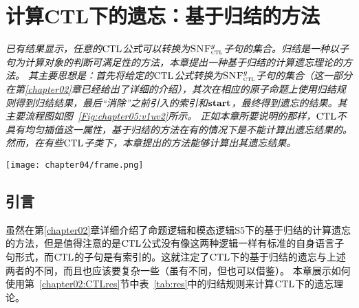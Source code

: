 \chapter{计算CTL下的遗忘：基于归结的方法}\label{chapter04}
{\em 
已有结果显示，任意的$\textrm{CTL}$公式可以转换为${\textsc{SNF}_{\textsc{ctl}}^g}$子句的集合。归结是一种以子句为计算对象的判断可满足性的方法，本章提出一种基于归结的计算遗忘理论的方法。
其主要思想是：首先将给定的$\textrm{CTL}$公式转换为${\textsc{SNF}_{\textsc{ctl}}^g}$子句的集合（这一部分在第\ref{chapter02}章已经给出了详细的介绍），其次在相应的原子命题上使用归结规则得到归结结果，最后“消除”之前引入的索引和$\textbf{start}$，最终得到遗忘的结果。其主要流程图如图~\ref{Fig:chapter05:v1uv2}所示。
正如本章所要说明的那样，$\textrm{CTL}$不具有均匀插值这一属性，基于归结的方法在有的情况下是不能计算出遗忘结果的。然而，在有些$\textrm{CTL}$子类下，本章提出的方法能够计算出其遗忘结果。}
\begin{figure*}[!htb]
	\centering
	\texttt{[image: chapter04/frame.png]}\\
	\caption{基于归结的遗忘的主要流程图}
	\label{Fig:chapter05:v1uv2}
\end{figure*}

\section{引言}
虽然在第\ref{chapter02}章详细介绍了命题逻辑和模态逻辑S5下的基于归结的计算遗忘的方法，但是值得注意的是$\textrm{CTL}$公式没有像这两种逻辑一样有标准的自身语言子句形式，而$\textrm{CTL}$的子句是有索引的。这就注定了$\textrm{CTL}$下的基于归结的遗忘与上述两者的不同，而且也应该要复杂一些（虽有不同，但也可以借鉴）。
本章展示如何使用第~\ref{chapter02:CTLres}节中表~\ref{tab:res}中的归结规则来计算$\textrm{CTL}$下的遗忘理论。





